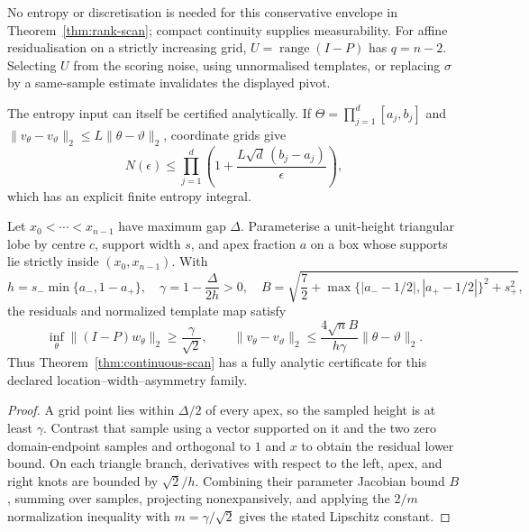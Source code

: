 No entropy or discretisation is needed for this conservative envelope in
Theorem~\ref{thm:rank-scan}; compact continuity supplies measurability.
For affine residualisation on a strictly increasing grid,
$U=\operatorname{range}(I-P)$ has $q=n-2$.  Selecting $U$ from the scoring
noise, using unnormalised templates, or replacing $\sigma$ by a same-sample
estimate invalidates the displayed pivot.

The entropy input can itself be certified analytically.  If
$\Theta=\prod_{j=1}^d[a_j,b_j]$ and
$\|v_\theta-v_\vartheta\|_2\le L\|\theta-\vartheta\|_2$, coordinate grids
give
\begin{equation}
 N(\epsilon)\le\prod_{j=1}^d
 \left(1+\frac{L\sqrt d\,(b_j-a_j)}{\epsilon}\right),
\end{equation}
which has an explicit finite entropy integral.

\begin{corollary}
\label{cor:triangular-continuous}
Let $x_0<\cdots<x_{n-1}$ have maximum gap $\Delta$.  Parameterise a
unit-height triangular lobe by centre $c$, support width $s$, and apex fraction
$a$ on a box whose supports lie strictly inside $(x_0,x_{n-1})$.  With
\begin{equation}
 h=s_-\min\{a_-,1-a_+\},\quad
 \gamma=1-\frac{\Delta}{2h}>0,\quad
 B=\sqrt{\frac72+\max\{|a_--1/2|,|a_+-1/2|\}^2+s_+^2},
\end{equation}
the residuals and normalized template map satisfy
\begin{equation}
 \inf_\theta\|(I-P)w_\theta\|_2\ge\frac{\gamma}{\sqrt2},\qquad
 \|v_\theta-v_\vartheta\|_2
 \le\frac{4\sqrt n B}{h\gamma}\|\theta-\vartheta\|_2.
\end{equation}
Thus Theorem~\ref{thm:continuous-scan} has a fully analytic certificate for
this declared location--width--asymmetry family.
\end{corollary}
\begin{proof}
A grid point lies within $\Delta/2$ of every apex, so the sampled height is at
least $\gamma$.  Contrast that sample using a vector supported on it and the
two zero domain-endpoint samples and orthogonal
to $1$ and $x$ to obtain the residual lower bound.  On
each triangle branch, derivatives with respect to the left, apex, and right
knots are bounded by $\sqrt2/h$.  Combining their parameter Jacobian bound
$B$, summing over samples, projecting nonexpansively, and applying the
$2/m$ normalization inequality with $m=\gamma/\sqrt2$ gives the stated
Lipschitz constant.
\end{proof}

